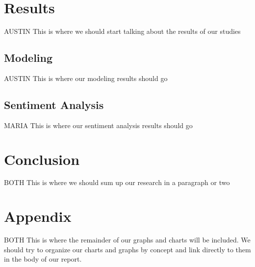 \documentclass[11pt,english]{article}
\begin{document}
\section{Results}
    AUSTIN
    This is where we should start talking about the results of our studies

\subsection{Modeling}
    AUSTIN
    This is where our modeling results should go

\subsection{Sentiment Analysis}
    MARIA
    This is where our sentiment analysis results should go

\section{Conclusion}
    BOTH
    This is where we should sum up our research in a paragraph or two

\newpage
\section{Appendix}
    BOTH
    This is where the remainder of our graphs and charts will be included. We should try to organize our charts and graphs by concept and link directly to them in the body of our report.
\end{document}
